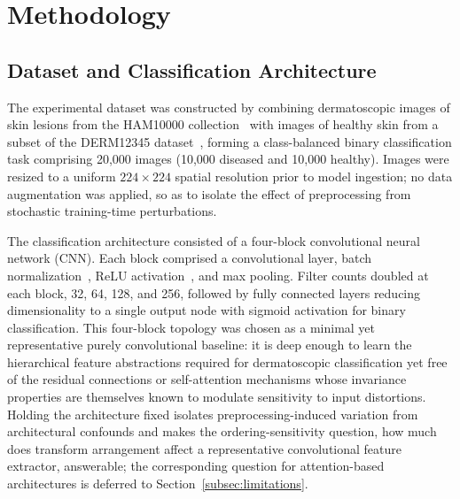 \documentclass[preprint,5p,times,twocolumn]{elsarticle}
\begin{document}
\section{Methodology}
\label{sec:methods}

\subsection{Dataset and Classification Architecture}
\label{subsec:dataset}

The experimental dataset was constructed by combining dermatoscopic images of skin lesions from the HAM10000 collection~\cite{DBLP:journals/corr/abs-1803-10417, Codella2019} with images of healthy skin from a subset of the DERM12345 dataset~\cite{yilmaz2024derm12345largemultisourcedermatoscopic}, forming a class-balanced binary classification task comprising 20{,}000 images (10{,}000 diseased and 10{,}000 healthy). Images were resized to a uniform $224 \times 224$ spatial resolution prior to model ingestion; no data augmentation was applied, so as to isolate the effect of preprocessing from stochastic training-time perturbations.

The classification architecture consisted of a four-block convolutional neural network (CNN). Each block comprised a convolutional layer, batch normalization~\cite{IoffeSzegedy2015}, ReLU activation~\cite{NairHinton2010}, and max pooling. Filter counts doubled at each block, 32, 64, 128, and 256, followed by fully connected layers reducing dimensionality to a single output node with sigmoid activation for binary classification. This four-block topology was chosen as a minimal yet representative purely convolutional baseline: it is deep enough to learn the hierarchical feature abstractions required for dermatoscopic classification yet free of the residual connections or self-attention mechanisms whose invariance properties are themselves known to modulate sensitivity to input distortions. Holding the architecture fixed isolates preprocessing-induced variation from architectural confounds and makes the ordering-sensitivity question, how much does transform arrangement affect a representative convolutional feature extractor, answerable; the corresponding question for attention-based architectures is deferred to Section~\ref{subsec:limitations}.
\end{document}
